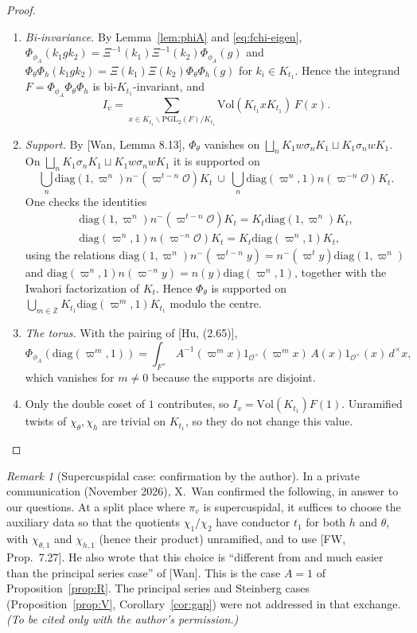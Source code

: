 \documentclass[11pt]{amsart}
\theoremstyle{definition}
\theoremstyle{remark}
\newtheorem{remark}[theorem]{Remark}
\newcommand{\Z}{\mathbb{Z}}
\newcommand{\cO}{\mathcal{O}}
\newcommand{\PGL}{\mathrm{PGL}}
\newcommand{\Vol}{\mathrm{Vol}}
\newcommand{\vp}{\varpi}
\newcommand{\nm}{n^{-}}
\newcommand{\diag}{\mathrm{diag}}
\begin{document}
\begin{proof}
\begin{enumerate}[label=(\arabic*)]
\item \emph{Bi-invariance.} By Lemma~\ref{lem:phiA} and \eqref{eq:fchi-eigen}, $\Phi_{\phi_A}(k_1gk_2)=\Xi^{-1}(k_1)\Xi^{-1}(k_2)\Phi_{\phi_A}(g)$ and $\Phi_\theta\Phi_h(k_1gk_2)=\Xi(k_1)\Xi(k_2)\Phi_\theta\Phi_h(g)$ for $k_i\in K_{t_1}$. Hence the integrand $F=\Phi_{\phi_A}\Phi_\theta\Phi_h$ is bi-$K_{t_1}$-invariant, and
\[ I_v=\sum_{x\in K_{t_1}\backslash\PGL_2(F)/K_{t_1}}\Vol(K_{t_1}xK_{t_1})\,F(x). \]
\item \emph{Support.} By [Wan, Lemma 8.13], $\Phi_\theta$ vanishes on $\bigsqcup_n K_1w\sigma_nK_1\sqcup K_1\sigma_nwK_1$. On $\bigsqcup_n K_1\sigma_nK_1\sqcup K_1w\sigma_nwK_1$ it is supported on
\[\textstyle\bigcup_n\diag(1,\vp^n)\nm(\vp^{t-n}\cO)K_t\ \cup\ \bigcup_n\diag(\vp^n,1)n(\vp^{-n}\cO)K_t .\]
One checks the identities
\begin{gather*}
\diag(1,\vp^n)\nm(\vp^{t-n}\cO)K_t=K_t\diag(1,\vp^n)K_t,\\ \diag(\vp^n,1)n(\vp^{-n}\cO)K_t=K_t\diag(\vp^n,1)K_t,
\end{gather*}
using the relations $\diag(1,\vp^n)\nm(\vp^{t-n}y)=\nm(\vp^ty)\diag(1,\vp^n)$ and $\diag(\vp^n,1)n(\vp^{-n}y)=n(y)\diag(\vp^n,1)$, together with the Iwahori factorization of $K_t$. Hence $\Phi_\theta$ is supported on $\bigcup_{m\in\Z}K_{t_1}\diag(\vp^m,1)K_{t_1}$ modulo the centre.
\item \emph{The torus.} With the pairing of [Hu, (2.65)],
\[\Phi_{\phi_A}(\diag(\vp^m,1))=\int_{F^\times}A^{-1}(\vp^mx)1_{\cO^\times}(\vp^mx)\,A(x)1_{\cO^\times}(x)\,d^\times x,\]
which vanishes for $m\neq0$ because the supports are disjoint.
\item Only the double coset of $1$ contributes, so $I_v=\Vol(K_{t_1})F(1)$. Unramified twists of $\chi_\theta,\chi_h$ are trivial on $K_{t_1}$, so they do not change this value.\qedhere
\end{enumerate}
\end{proof}


\begin{remark}[Supercuspidal case: confirmation by the author]\label{rem:wan}
In a private communication (November 2026), X.~Wan confirmed the following, in answer to our questions. At a split place where $\pi_v$ is supercuspidal, it suffices to choose the auxiliary data so that the quotients $\chi_1/\chi_2$ have conductor $t_1$ for both $h$ and $\theta$, with $\chi_{\theta,1}$ and $\chi_{h,1}$ (hence their product) unramified, and to use [FW, Prop.~7.27]. He also wrote that this choice is ``different from and much easier than the principal series case'' of [Wan]. This is the case $A=1$ of Proposition~\ref{prop:R}. The principal series and Steinberg cases (Proposition~\ref{prop:V}, Corollary~\ref{cor:gap}) were not addressed in that exchange. \emph{(To be cited only with the author's permission.)}
\end{remark}
\end{document}
